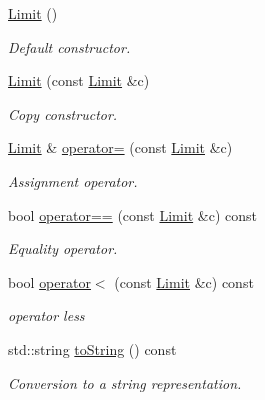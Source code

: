 \begin{DoxyCompactItemize}
\item 
\hyperlink{class_d_d4hep_1_1_geometry_1_1_limit_af8c3f725caf1e3b50b86e2dbfefad3e1}{Limit} ()
\begin{DoxyCompactList}\small\item\em Default constructor. \end{DoxyCompactList}\item 
\hyperlink{class_d_d4hep_1_1_geometry_1_1_limit_a60ce84b00fb40254e489228e52db8aab}{Limit} (const \hyperlink{class_d_d4hep_1_1_geometry_1_1_limit}{Limit} \&c)
\begin{DoxyCompactList}\small\item\em Copy constructor. \end{DoxyCompactList}\item 
\hyperlink{class_d_d4hep_1_1_geometry_1_1_limit}{Limit} \& \hyperlink{class_d_d4hep_1_1_geometry_1_1_limit_a552afa647ac82252e601c3cd02d41e21}{operator=} (const \hyperlink{class_d_d4hep_1_1_geometry_1_1_limit}{Limit} \&c)
\begin{DoxyCompactList}\small\item\em Assignment operator. \end{DoxyCompactList}\item 
bool \hyperlink{class_d_d4hep_1_1_geometry_1_1_limit_a2b3bc1de601d03a27e58e8ca19cb8012}{operator==} (const \hyperlink{class_d_d4hep_1_1_geometry_1_1_limit}{Limit} \&c) const
\begin{DoxyCompactList}\small\item\em Equality operator. \end{DoxyCompactList}\item 
bool \hyperlink{class_d_d4hep_1_1_geometry_1_1_limit_ac66f41fcb6396cd76ab035804daddfa7}{operator$<$} (const \hyperlink{class_d_d4hep_1_1_geometry_1_1_limit}{Limit} \&c) const
\begin{DoxyCompactList}\small\item\em operator less \end{DoxyCompactList}\item 
std\+::string \hyperlink{class_d_d4hep_1_1_geometry_1_1_limit_a927e269dc3887a7408b00f8e2c61c590}{to\+String} () const
\begin{DoxyCompactList}\small\item\em Conversion to a string representation. \end{DoxyCompactList}\end{DoxyCompactItemize}
